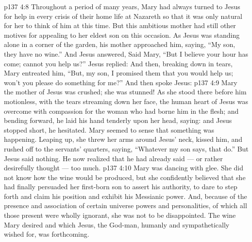 \vs p137 4:8 Throughout a period of many years, Mary had always turned to Jesus for help in every crisis of their home life at Nazareth so that it was only natural for her to think of him at this time. But this ambitious mother had still other motives for appealing to her eldest son on this occasion. As Jesus was standing alone in a corner of the garden, his mother approached him, saying, “My son, they have no wine.” And Jesus answered,  Said Mary, “But I believe your hour has come; cannot you help us?” Jesus replied:  And then, breaking down in tears, Mary entreated him, “But, my son, I promised them that you would help us; won’t you please do something for me?” And then spoke Jesus: 
\vs p137 4:9 Mary the mother of Jesus was crushed; she was stunned! As she stood there before him motionless, with the tears streaming down her face, the human heart of Jesus was overcome with compassion for the woman who had borne him in the flesh; and bending forward, he laid his hand tenderly upon her head, saying:  and Jesus stopped short, he hesitated. Mary seemed to sense that something was happening. Leaping up, she threw her arms around Jesus’ neck, kissed him, and rushed off to the servants’ quarters, saying, “Whatever my son says, that do.” But Jesus said nothing. He now realized that he had already said --- or rather desirefully thought --- too much.
\vs p137 4:10 Mary was dancing with glee. She did not know how the wine would be produced, but she confidently believed that she had finally persuaded her first\hyp{}born son to assert his authority, to dare to step forth and claim his position and exhibit his Messianic power. And, because of the presence and association of certain universe powers and personalities, of which all those present were wholly ignorant, she was not to be disappointed. The wine Mary desired and which Jesus, the God\hyp{}man, humanly and sympathetically wished for, was forthcoming.
